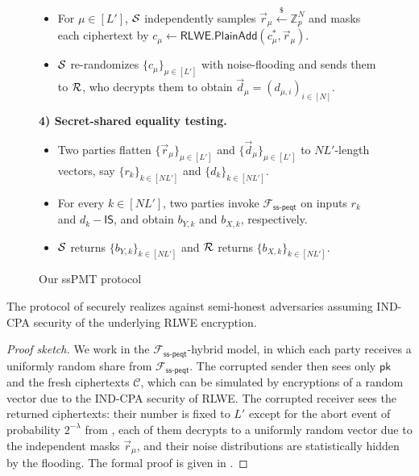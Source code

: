 \begin{figure}[t]
{\begin{minipage}{0.95\textwidth}
\begin{itemize}
    \item For \(\mu\in[L']\), $\mathcal{S}$ independently samples $ \vec r_\mu \xleftarrow{\$}\mathbb Z_p^N$ and masks each ciphertext by $c_\mu \leftarrow \mathsf{RLWE.PlainAdd}(c_\mu^*,\vec r_\mu)$.
   
    \item $\mathcal{S}$ re-randomizes \(\{c_\mu\}_{\mu\in[L']}\) with noise-flooding and sends them to $\mathcal{R}$, who decrypts them to obtain $\vec d_\mu=(d_{\mu,i})_{i\in[N]}$.
\end{itemize}

\medskip
\noindent
\textbf{4) Secret-shared equality testing.}

\begin{itemize}
    \item Two parties flatten $\{\vec r_\mu\}_{\mu \in [L']}$ and $\{\vec d_\mu\}_{\mu \in [L']}$ to $NL'$-length vectors, say $\{r_k\}_{k\in [NL']}$ and $\{d_k\}_{k \in [NL']}$. 
    
    \item For every $k \in [NL']$, two parties invoke $\mathcal{F}_{\mathsf{ss\mbox{-}peqt}}$ on inputs \(r_{k}\) and \(d_{k}-\mathsf{IS}\), and obtain \(b_{Y,k}\) and \(b_{X,k}\), respectively.

    \item $\mathcal{S}$ returns $\{b_{Y,k}\}_{k\in [NL']}$ and $\mathcal{R}$ returns $\{b_{X,k}\}_{k\in [NL']}$.
\end{itemize}

\end{minipage}
}
\caption{Our ssPMT protocol}
\label{fig:our-sspmt-protocol}
\end{figure}

\begin{theorem} \label{thm:semi-honest-sspmt}
     The protocol of  securely realizes  against semi-honest adversaries assuming IND-CPA security of the underlying RLWE encryption.
\end{theorem}

\begin{proof}[Proof sketch]
    We work in the $\mathcal{F}_{\mathsf{ss\mbox{-}peqt}}$-hybrid model, in which each party receives a uniformly random share from $\mathcal{F}_{\mathsf{ss\mbox{-}peqt}}$. The corrupted sender then sees only $\mathsf{pk}$ and the fresh ciphertexts $\mathcal{C}$, which can be simulated by encryptions of a random vector due to the IND-CPA security of RLWE. The corrupted receiver sees the returned ciphertexts: their number is fixed to $L'$ except for the abort event of probability $2^{-\lambda}$ from , each of them decrypts to a uniformly random vector due to the independent masks $\vec r_\mu$, and their noise distributions are statistically hidden by the flooding. The formal proof is given in .
\end{proof}


